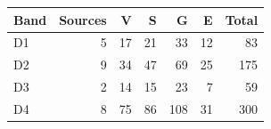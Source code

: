 \begin{tabularx}{\linewidth}{Xrrrrrr}
\toprule
Band & Sources & V & S & G & E & Total\\\midrule
D1 & 5 & 17 & 21 & 33 & 12 & 83\\
D2 & 9 & 34 & 47 & 69 & 25 & 175\\
D3 & 2 & 14 & 15 & 23 & 7 & 59\\
D4 & 8 & 75 & 86 & 108 & 31 & 300\\
\bottomrule
\end{tabularx}
